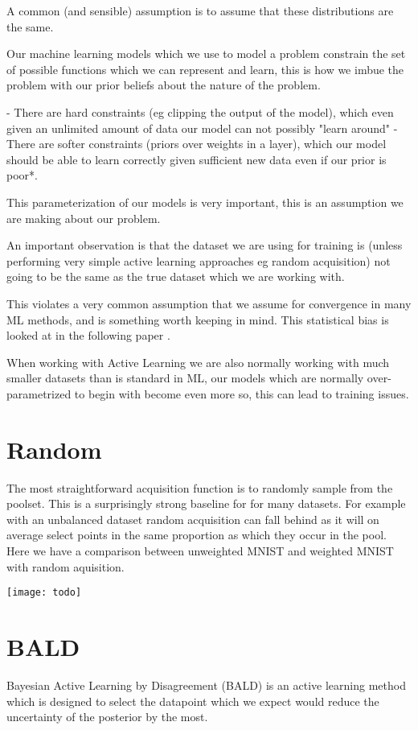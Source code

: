 \documentclass[12pt, a4paper]{report}
\theoremstyle{definition}
\theoremstyle{definition}
\theoremstyle{definition}
\begin{document}
A common (and sensible) assumption is to assume that these distributions are the same.

Our machine learning models which we use to model a problem constrain the set of possible functions which we can represent and learn, this is how we imbue the problem with our prior beliefs about the nature of the problem.

- There are hard constraints (eg clipping the output of the model), which even given an unlimited amount of data our model can not possibly "learn around"
- There are softer constraints (priors over weights in a layer), which our model should be able to learn correctly given sufficient new data even if our prior is poor*.

This parameterization of our models is very important, this is an assumption we are making about our problem.

An important observation is that the dataset we are using for training is (unless performing very simple active learning approaches eg random acquisition) not going to be the same as the true dataset which we are working with. 

This violates a very common assumption that we assume for convergence in many ML methods, and is something worth keeping in mind. This statistical bias is looked at in the following paper \cite{farquhar2021statistical}.

When working with Active Learning we are also normally working with much smaller datasets than is standard in ML, our models which are normally over-parametrized to begin with become even more so, this can lead to training issues.

\section{Random}

The most straightforward acquisition function is to randomly sample from the poolset. This is a surprisingly strong baseline for for many datasets. For example with an unbalanced dataset random acquisition can fall behind as it will on average select points in the same proportion as which they occur in the pool. Here we have a comparison between unweighted MNIST and weighted MNIST with random aquisition.

\texttt{[image: todo]}


\section{BALD}
Bayesian Active Learning by Disagreement (BALD) \cite{houlsby2011bayesian} is an active learning method which is designed to select the datapoint which we expect would reduce the uncertainty of the posterior by the most.
\end{document}
